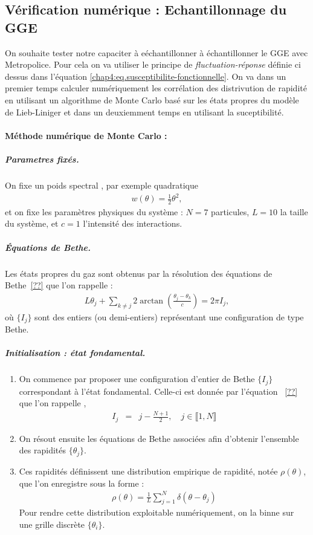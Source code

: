 \subsection{Vérification numérique : Echantillonnage du GGE}

On souhaite tester notre capaciter à eéchantillonner à échantillonner le GGE avec Metropolice. Pour cela on va utiliser le principe de \emph{fluctuation-réponse} définie ci dessus dans l'équation \eqref{chap4:eq.susceptibilite-fonctionnelle}. On va dans un premier temps calculer numériquement les corrélation des distrivution de rapidité en utilisant un algorithme de Monte Carlo basé sur les états propres du modèle de Lieb-Liniger et dans un deuxiemment temps en utilisant la suceptibilité.




\paragraph{Méthode numérique de Monte Carlo  :} 

\subparagraph{Parametres fixés.}
On fixe un poids spectral , par exemple quadratique
\begin{eqnarray}
	w(\theta) = \tfrac{1}{2} \theta^2,
\end{eqnarray}
et on fixe les paramètres physiques du système : \( N = 7 \) particules, \( L = 10 \) la taille du système, et \( c = 1 \) l’intensité des interactions.

\subparagraph{Équations de Bethe.}
Les états propres du gaz sont obtenus par la résolution des équations de Bethe~\eqref{??} que l'on rappelle :
\begin{eqnarray}
	L \theta_j + \sum_{k \ne j} 2 \arctan \left( \frac{\theta_j - \theta_k}{c} \right) = 2 \pi I_j,
\end{eqnarray}
où \( \{I_j\} \) sont des entiers (ou demi-entiers) représentant une configuration de type Bethe.\\

\subparagraph{Initialisation : état fondamental.}
\begin{enumerate}
    \item On commence par proposer une configuration d'entier de Bethe  \( \{I_j\} \) correspondant à l’état fondamental. Celle-ci est donnée par l'équation ~\eqref{??} que l'on rappelle ,
		\begin{eqnarray}
			I_j & = & j - \frac{N+1}{2}, \quad j \in \llbracket 1 , N \rrbracket	
		\end{eqnarray}

    \item On résout ensuite les équations de Bethe associées afin d'obtenir l’ensemble des rapidités \( \{ \theta_j \} \).

	\item Ces rapidités définissent une distribution empirique de rapidité, notée \( \rho(\theta) \), que l’on enregistre sous la forme :
	\begin{eqnarray}
    	\rho(\theta) = \frac{1}{L} \sum_{j=1}^N \delta(\theta - \theta_j)
	\end{eqnarray}
	Pour rendre cette distribution exploitable numériquement, on la binne sur une grille discrète \( \{ \theta_i \} \).
\end{enumerate}

